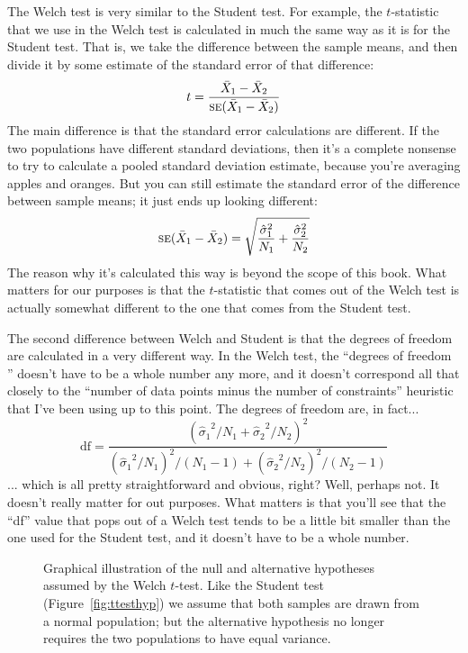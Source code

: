 The Welch test is very similar to the Student test. For example, the $t$-statistic that we use in the Welch test is calculated in much the same way as it is for the Student test. That is, we take the difference between the sample means, and then divide it by some estimate of the standard error of that difference:
$$
t = \frac{\bar{X}_1 - \bar{X}_2}{\SE{\bar{X}_1 - \bar{X}_2}}
$$
The main difference is that the standard error calculations are different. If the two populations have different standard deviations, then it's a complete nonsense to try to calculate a pooled standard deviation estimate, because you're averaging apples and oranges. But you can still estimate the standard error of the difference between sample means; it just ends up looking different:
$$
\SE{\bar{X}_1 - \bar{X}_2} = \sqrt{ \frac{{\hat{\sigma}_1}^2}{N_1} + \frac{{\hat{\sigma}_2}^2}{N_2} }
$$
The reason why it's calculated this way is beyond the scope of this book. What matters for our purposes is that the $t$-statistic that comes out of the Welch test is actually somewhat different to the one that comes from the Student test. 

The second difference between Welch and Student is that the degrees of freedom are calculated in a very different way. In the Welch test, the ``degrees of freedom '' doesn't have to be a whole number any more, and it doesn't correspond all that closely to the ``number of data points minus the number of constraints'' heuristic that I've been using up to this point. The degrees of freedom are, in fact...
$$
\mbox{df} = \frac{ ({\hat{\sigma}_1}^2 / N_1 + {\hat{\sigma}_2}^2 / N_2)^2 }{  ({\hat{\sigma}_1}^2 / N_1)^2 / (N_1 -1 )  + ({\hat{\sigma}_2}^2 / N_2)^2 / (N_2 -1 ) } 
$$
... which is all pretty straightforward and obvious, right? Well, perhaps not. It doesn't really matter for out purposes. What matters is that you'll see that the ``df'' value that pops out of a Welch test tends to be a little bit smaller than the one used for the Student test, and it doesn't have to be a whole number. 


\begin{figure}
\begin{center}
\caption{Graphical illustration of the null and alternative hypotheses assumed by the Welch $t$-test. Like the Student test (Figure~\ref{fig:ttesthyp}) we assume that both samples are drawn from a normal population; but the alternative hypothesis no longer requires the two populations to have equal variance.}
\HR
\label{fig:ttesthyp2}
\end{center}
\end{figure}




